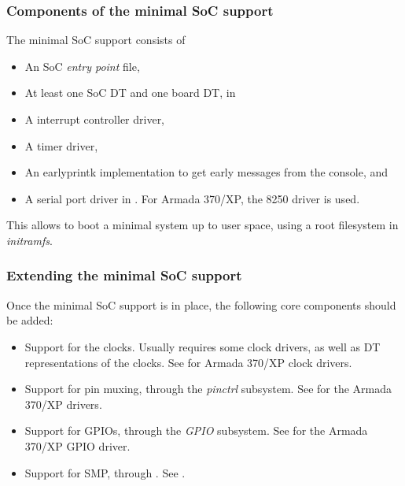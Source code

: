 \begin{frame}
  \frametitle{Components of the minimal SoC support}
  The minimal SoC support consists of
  \footnotesize
  \begin{itemize}
  \item An SoC {\em entry point} file,
  \item At least one SoC  DT and one board  DT,
    in 
  \item A interrupt controller driver,
  \item A timer driver,
  \item An earlyprintk implementation to get early messages from the
    console,  and
  \item A serial port driver in . For Armada
    370/XP, the 8250 driver  is used.
  \end{itemize}
  \normalsize
  This allows to boot a minimal system up to user space, using a root
  filesystem in {\em initramfs}.
\end{frame}

\begin{frame}
  \frametitle{Extending the minimal SoC support}

  Once the minimal SoC support is in place, the following core
  components should be added:
  \begin{itemize}
  \item Support for the clocks. Usually requires some clock drivers,
    as well as DT representations of the clocks. See
     for Armada 370/XP clock drivers.
  \item Support for pin muxing, through the {\em pinctrl}
    subsystem. See  for the Armada 370/XP
    drivers.
  \item Support for GPIOs, through the {\em GPIO} subsystem. See
     for the Armada 370/XP GPIO
    driver.
  \item Support for SMP, through . See
    .
  \end{itemize}
\end{frame}

